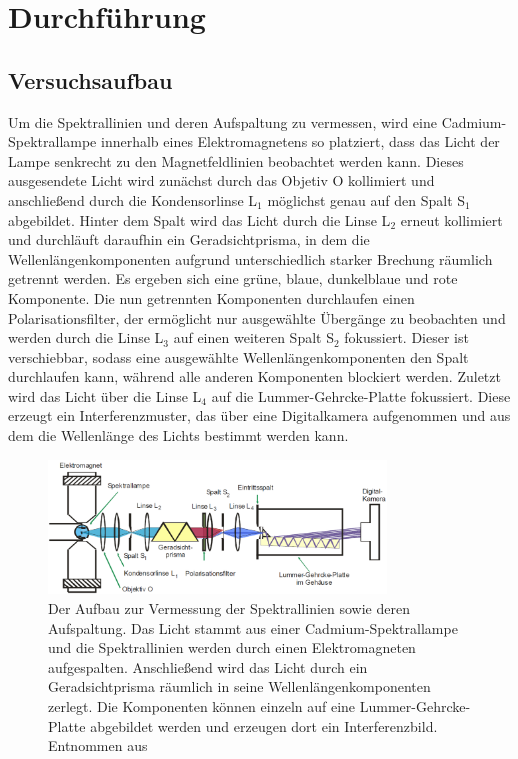 \newpage
\section{Durchführung}
    \subsection{Versuchsaufbau}
        Um die Spektrallinien und deren Aufspaltung zu vermessen, wird eine Cadmium-Spektrallampe innerhalb eines Elektromagnetens so platziert, dass das Licht der Lampe senkrecht zu den Magnetfeldlinien 
        beobachtet werden kann. Dieses ausgesendete Licht wird zunächst durch das Objetiv O kollimiert und anschließend durch die Kondensorlinse L$_1$ möglichst genau auf den Spalt S$_1$ abgebildet. Hinter 
        dem Spalt wird das Licht durch die Linse L$_2$ erneut kollimiert und durchläuft daraufhin ein Geradsichtprisma, in dem die Wellenlängenkomponenten aufgrund unterschiedlich starker Brechung räumlich 
        getrennt werden. Es ergeben sich eine grüne, blaue, dunkelblaue und rote Komponente. Die nun getrennten Komponenten durchlaufen einen Polarisationsfilter, der ermöglicht nur ausgewählte Übergänge zu 
        beobachten und werden durch die Linse L$_3$ auf einen weiteren Spalt S$_2$ fokussiert. Dieser ist verschiebbar, sodass eine ausgewählte Wellenlängenkomponenten den Spalt durchlaufen kann, während alle 
        anderen Komponenten blockiert werden. Zuletzt wird das Licht über die Linse L$_4$ auf die Lummer-Gehrcke-Platte fokussiert. Diese erzeugt ein Interferenzmuster, das über eine Digitalkamera aufgenommen 
        und aus dem die Wellenlänge des Lichts bestimmt werden kann.

        \FloatBarrier

        \begin{figure}[h]
          \centering
          \includegraphics[width = 0.8\textwidth]{pictures/Aufbau.png}
          \caption{Der Aufbau zur Vermessung der Spektrallinien sowie deren Aufspaltung. Das Licht stammt aus einer Cadmium-Spektrallampe und die Spektrallinien werden durch einen Elektromagneten aufgespalten. Anschließend wird das Licht durch ein Geradsichtprisma räumlich in seine Wellenlängenkomponenten zerlegt. Die Komponenten können einzeln auf eine Lummer-Gehrcke-Platte abgebildet werden und erzeugen dort ein Interferenzbild. Entnommen aus \cite{tu_dortmund_versuchsanleitung_2021-5}}
          \label{fig:Aufbau}
        \end{figure}
    

